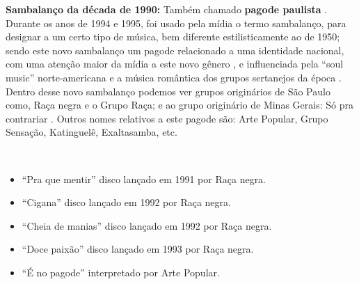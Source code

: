 \textbf{Sambalanço da década de 1990:} Também chamado \textbf{pagode paulista}  \cite[pp. 130]{perna2002samba}.
Durante os anos de 1994 e 1995, 
foi usado pela mídia o termo sambalanço, para designar a um certo tipo de música, 
bem diferente estilisticamente ao de 1950;
sendo este novo sambalanço um pagode relacionado a uma identidade nacional,
com uma atenção maior da mídia a este novo gênero \cite[pp. 127]{vianna1999bezerra}, 
e influenciada pela ``soul music'' norte-americana e a música romântica dos grupos sertanejos da época  \cite[pp. 130-131]{perna2002samba}.
Dentro desse novo sambalanço podemos ver grupos originários de São Paulo como, Raça negra e o Grupo Raça;
e ao grupo originário de Minas Gerais: Só pra contrariar \cite[pp. 130]{perna2002samba} \cite[pp. 128]{vianna1999bezerra}.
Outros nomes relativos a este pagode são: Arte Popular, Grupo Sensação, Katinguelê, Exaltasamba, etc.

\begin{example} ~

\begin{itemize}
\item ``Pra que mentir'' disco lançado em 1991 por Raça negra.
\item ``Cigana'' disco lançado em 1992 por Raça negra.
\item ``Cheia de manias'' disco lançado em 1992 por Raça negra.
\item ``Doce paixão'' disco lançado em 1993 por Raça negra.
\item ``É no pagode'' interpretado por Arte Popular.
\end{itemize}
\end{example}

